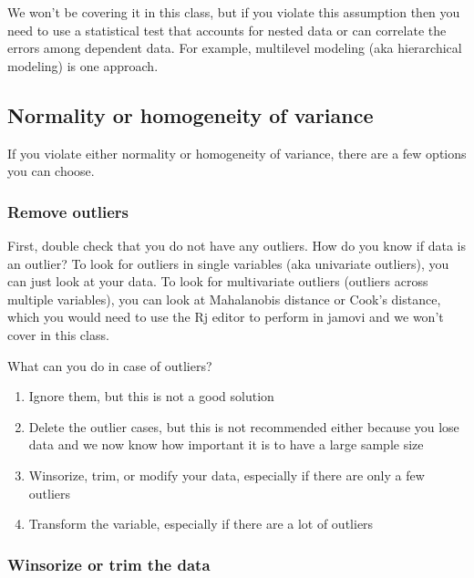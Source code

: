 \documentclass[
]{book}
\providecommand{\tightlist}{%
  \setlength{\itemsep}{0pt}\setlength{\parskip}{0pt}}
\begin{document}
We won't be covering it in this class, but if you violate this assumption then you need to use a statistical test that accounts for nested data or can correlate the errors among dependent data. For example, multilevel modeling (aka hierarchical modeling) is one approach.

\hypertarget{normality-or-homogeneity-of-variance}{%
\subsection{Normality or homogeneity of variance}\label{normality-or-homogeneity-of-variance}}

If you violate either normality or homogeneity of variance, there are a few options you can choose.

\hypertarget{remove-outliers}{%
\subsubsection{Remove outliers}\label{remove-outliers}}

First, double check that you do not have any outliers. How do you know if data is an outlier? To look for outliers in single variables (aka univariate outliers), you can just look at your data. To look for multivariate outliers (outliers across multiple variables), you can look at Mahalanobis distance or Cook's distance, which you would need to use the Rj editor to perform in jamovi and we won't cover in this class.

What can you do in case of outliers?

\begin{enumerate}
\def\labelenumi{\arabic{enumi}.}
\tightlist
\item
  Ignore them, but this is not a good solution
\item
  Delete the outlier cases, but this is not recommended either because you lose data and we now know how important it is to have a large sample size
\item
  Winsorize, trim, or modify your data, especially if there are only a few outliers
\item
  Transform the variable, especially if there are a lot of outliers
\end{enumerate}

\hypertarget{winsorize-or-trim-the-data}{%
\subsubsection{Winsorize or trim the data}\label{winsorize-or-trim-the-data}}
\end{document}
